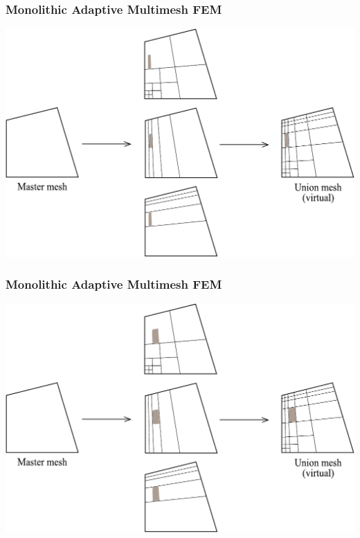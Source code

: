 \begin{frame}
  \frametitle{Monolithic Adaptive Multimesh FEM}
  \begin{center}
    \includegraphics[height=0.7\textheight]{multimesh/mm_16.pdf}
  \end{center}
\end{frame}

\begin{frame}
  \frametitle{Monolithic Adaptive Multimesh FEM}
  \begin{center}
    \includegraphics[height=0.7\textheight]{multimesh/mm_17.pdf}
  \end{center}
\end{frame}

